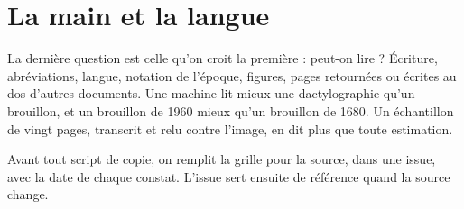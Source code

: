 \section{La main et la langue}

La dernière question est celle qu'on croit la première : peut-on lire ? Écriture,
abréviations, langue, notation de l'époque, figures, pages retournées ou écrites au dos
d'autres documents. Une machine lit mieux une dactylographie qu'un brouillon, et un
brouillon de 1960 mieux qu'un brouillon de 1680. Un échantillon de vingt pages, transcrit
et relu contre l'image, en dit plus que toute estimation.

\begin{regle}
Avant tout script de copie, on remplit la grille pour la source, dans une issue, avec la
date de chaque constat. L'issue sert ensuite de référence quand la source change.
\end{regle}
